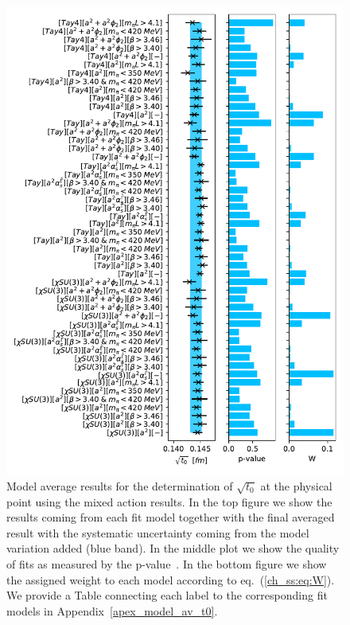\begin{figure}
    \centering
    \includegraphics[width=1.\textwidth]{./cap5/figs/BMA_tm.pdf}
    \caption{Model average results for the determination of $\sqrt{t_0}$ at the physical point using the mixed action results. In the top figure we show the results coming from each fit model together with the final averaged result with the systematic uncertainty coming from the model variation added (blue band). In the middle plot we show the quality of fits as measured by the p-value~\citep{Bruno:2022mfy}. In the bottom figure we show the assigned weight to each model according to eq.~(\ref{ch_ss:eq:W}). We provide a Table connecting each label to the corresponding fit models in Appendix~\ref{apex_model_av_t0}.}
    \label{ch_ss:fig:BMA_tm}
\end{figure}

